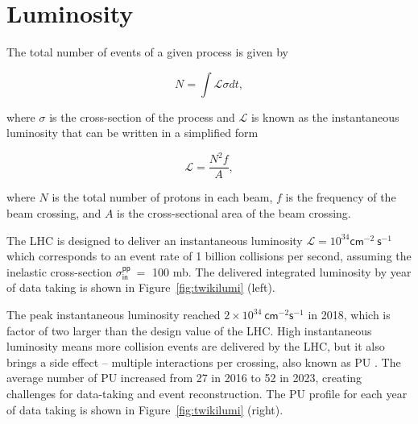 \section{Luminosity}
\label{sec:Lumi}

The total number of events of a given process is given by 

\begin{equation}
N=\int\mathcal{L}\sigma dt,
\end{equation}

where $\sigma$ is the cross-section of the process and $\mathcal{L}$ is known as the instantaneous luminosity that can be written in a simplified form

\begin{equation}
\mathcal{L}=\frac{N^2f}{A},
\end{equation}

where $N$ is the total number of protons in each beam, $f$ is the frequency of the beam crossing, and $A$ is the cross-sectional area of the beam crossing.

The \ac{LHC} is designed to deliver an instantaneous luminosity $\mathcal{L}=10^{34}\textsf{cm}^{-2}~\textsf{s}^{-1}$ which corresponds to an event rate of 1 billion collisions per second, assuming the inelastic cross-section $\sigma^{\textsf{pp}}_{\textsf{in}}~=$ 100 mb. The delivered integrated luminosity by year of data taking is shown in Figure~\ref{fig:twikilumi} (left).

The peak instantaneous luminosity reached $2\times10^{34}~\textsf{cm}^{-2}\textsf{s}^{-1}$ in 2018, which is factor of two larger than the design value of the \ac{LHC}. High instantaneous luminosity means more collision events are delivered by the \ac{LHC}, but it also brings a side effect -- multiple interactions per crossing, also known as \ac{PU} . The average number of \ac{PU} increased from 27 in 2016 to 52 in 2023, creating challenges for data-taking and event reconstruction. The \ac{PU} profile for each year of data taking is shown in Figure~\ref{fig:twikilumi} (right).

